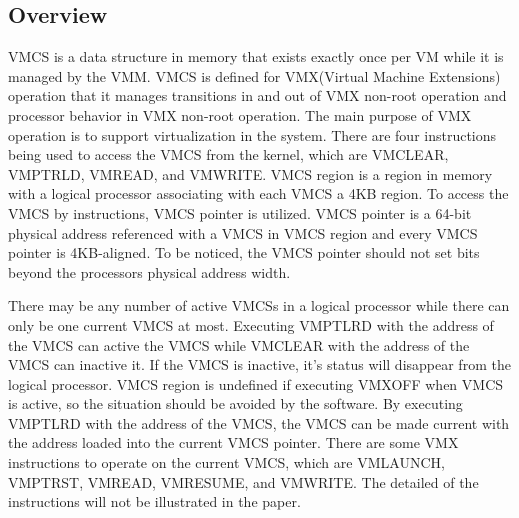 \documentclass[10pt,draftclsnofoot,journal,compsoc,onecolumn]{IEEEtran}
\begin{document}
\subsection{Overview}
	\par VMCS is a data structure in memory that exists exactly once per VM while it is managed by the VMM. VMCS is defined for VMX(Virtual Machine Extensions) operation that it manages transitions in and out of VMX non-root operation and processor behavior in VMX non-root operation. The main purpose of VMX operation is to support virtualization in the system. There are four instructions being used to access the VMCS from the kernel, which are VMCLEAR, VMPTRLD, VMREAD, and VMWRITE. VMCS region is a region in memory with a logical processor associating with each VMCS a 4KB region. To access the VMCS by instructions, VMCS pointer is utilized. VMCS pointer is a 64-bit physical address referenced with a VMCS in VMCS region and every VMCS pointer is 4KB-aligned. To be noticed, the VMCS pointer should not set bits beyond the processors physical address width. 
	\par There may be any number of active VMCSs in a logical processor while there can only be one current VMCS at most. Executing VMPTLRD with the address of the VMCS can active the VMCS while VMCLEAR with the address of the VMCS can inactive it. If the VMCS is inactive, it's status will disappear from the logical processor. VMCS region is undefined if executing VMXOFF when VMCS is active, so the situation should be avoided by the software. By executing VMPTLRD with the address of the VMCS, the VMCS can be made current with the address loaded into the current VMCS pointer. There are some VMX instructions to operate on the current VMCS, which are VMLAUNCH, VMPTRST, VMREAD, VMRESUME, and VMWRITE. The detailed of the instructions will not be illustrated in the paper.
\end{document}
